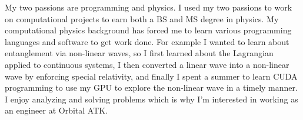 \vspace{-3mm}

\begin{cventries}
\vspace{-2mm}

\personalStatement
{
My two passions are programming and physics. I used my two passions to work on computational projects to earn both a BS and MS degree in physics. My computational physics background has forced me to learn various programming languages and software to get work done. For example I wanted to learn about entanglement via non-linear waves, so I first learned about the Lagrangian applied to continuous systems, I then converted a linear wave into a non-linear wave by enforcing special relativity, and finally I spent a summer to learn CUDA programming to use my GPU to explore the non-linear wave in a timely manner. I enjoy analyzing and solving problems which is why I'm interested in working as an engineer at Orbital ATK.
}


\end{cventries}
